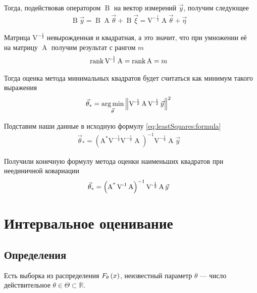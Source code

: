 Тогда, подействовав оператором $\operatorname{B}$ на вектор измерений $\vec{y}$,
получим следующее
\begin{align*}
  \operatorname{B} \vec{y}
  = \operatorname{B} \operatorname{A} \vec{\theta}
      + \operatorname{B} \vec{\xi}
  = \operatorname{V^{-\frac{1}{2}}} \operatorname{A} \vec{\theta} + \vec{\eta}
\end{align*}

Матрица $\operatorname{V^{-\frac{1}{2}}}$ невырожденная и квадратная, а это
значит, что при умножении её на матрицу $\operatorname{A}$ получим результат
с рангом $m$
\begin{align*}
  \operatorname{rank}{\operatorname{V^{-\frac{1}{1}}} \operatorname{A}}
  = \operatorname{rank}{\operatorname{A}}
  = m
\end{align*}

Тогда оценка метода минимальных квадратов будет считаться как минимум такого
выражения
\begin{align*}
  \vec{\theta}_*
  = \underset{\vec{\theta}}{\operatorname{arg\,min}}\left\| \operatorname{V^{-\frac{1}{2}}} \operatorname{A}
      \operatorname{V^{-\frac{1}{2}}} \vec{y} \right\|^2
\end{align*}

Подставим наши данные в исходную формулу \eqref{eq:leastSquares:formula}
\begin{align*}
  \vec{\theta}_*
  = \left( \operatorname{A^*} \operatorname{V^{-\frac{1}{2}}}
      \operatorname{V^{-\frac{1}{2}}} \operatorname{A} \right)^{-1}
      \operatorname{V^{-\frac{1}{2}}} \operatorname{A} \vec{y}
\end{align*}

Получили конечную формулу метода оценки наименьших квадратов при неединичной
ковариации
\begin{equation}\label{eq:leastSquares:formulaAdvanced}
  \index{оценка!метода наименьших квадратов!формула}
  \vec{\theta}_*
  = \left( \operatorname{A^*} \operatorname{V^{-1}}
      \operatorname{A} \right)^{-1}
      \operatorname{V^{-\frac{1}{2}}} \operatorname{A} \vec{y}
\end{equation}

\section{Интервальное оценивание}
\subsection{Определения}

Есть выборка \xsample из распределения $F_{\theta}\left(x\right)$,
неизвестный параметр $\theta$ --- число действительное
$\theta \in \Theta \subset \mathbb{R}$.

